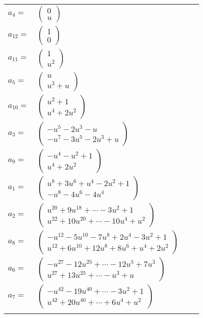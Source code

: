 \documentclass[1p]{elsarticle_modified}
\theoremstyle{definition}
\begin{document}
\begin{tabular}{m{7pt} m{180pt} m{7pt} m{180pt} }
\flushright $a_{4}=$&$\begin{pmatrix}0\\u\end{pmatrix}$ \\
\flushright $a_{12}=$&$\begin{pmatrix}1\\0\end{pmatrix}$ \\
\flushright $a_{11}=$&$\begin{pmatrix}1\\u^2\end{pmatrix}$ \\
\flushright $a_{5}=$&$\begin{pmatrix}u\\u^3+u\end{pmatrix}$ \\
\flushright $a_{10}=$&$\begin{pmatrix}u^2+1\\u^4+2 u^2\end{pmatrix}$ \\
\flushright $a_{3}=$&$\begin{pmatrix}- u^5-2 u^3- u\\- u^7-3 u^5-2 u^3+u\end{pmatrix}$ \\
\flushright $a_{9}=$&$\begin{pmatrix}- u^4- u^2+1\\u^4+2 u^2\end{pmatrix}$ \\
\flushright $a_{1}=$&$\begin{pmatrix}u^8+3 u^6+u^4-2 u^2+1\\- u^8-4 u^6-4 u^4\end{pmatrix}$ \\
\flushright $a_{2}=$&$\begin{pmatrix}u^{20}+9 u^{18}+\cdots-3 u^2+1\\u^{22}+10 u^{20}+\cdots-10 u^4+u^2\end{pmatrix}$ \\
\flushright $a_{8}=$&$\begin{pmatrix}- u^{12}-5 u^{10}-7 u^8+2 u^4-3 u^2+1\\u^{12}+6 u^{10}+12 u^8+8 u^6+u^4+2 u^2\end{pmatrix}$ \\
\flushright $a_{6}=$&$\begin{pmatrix}- u^{27}-12 u^{25}+\cdots-12 u^5+7 u^3\\u^{27}+13 u^{25}+\cdots- u^3+u\end{pmatrix}$ \\
\flushright $a_{7}=$&$\begin{pmatrix}- u^{42}-19 u^{40}+\cdots-3 u^2+1\\u^{42}+20 u^{40}+\cdots+6 u^4+u^2\end{pmatrix}$\\&\end{tabular}
\end{document}
